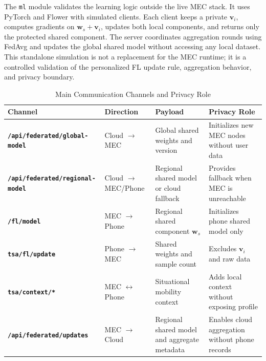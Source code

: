 \documentclass[lettersize,journal]{IEEEtran}
\begin{document}
The \texttt{ml} module validates the learning logic outside the live
MEC stack. It uses PyTorch and Flower with simulated clients. Each
client keeps a private $\mathbf{v}_i$, computes gradients on
$\mathbf{w}_s+\mathbf{v}_i$, updates both local components, and returns
only the protected shared component. The server coordinates aggregation
rounds using FedAvg and updates the global shared model without
accessing any local dataset. This standalone simulation is not a
replacement for the MEC runtime; it is a controlled validation of the
personalized FL update rule, aggregation behavior, and privacy boundary.

\begin{table}[!t]
    \centering
    \caption{Main Communication Channels and Privacy Role\label{tab:protocol}}
    \scriptsize
    \renewcommand{\arraystretch}{1.2}
    \begin{tabularx}{\textwidth}{
        >{\raggedright\bfseries\arraybackslash}p{3.6cm}
        >{\raggedright\arraybackslash}p{3.0cm}
        >{\raggedright}X
        >{\raggedright\arraybackslash}X}
        \toprule
        \rowcolor{gray!15}
        \textbf{Channel} & \textbf{Direction} &
        \textbf{Payload} & \textbf{Privacy Role} \\
        \midrule
        \texttt{/api/federated/global-model} &
        Cloud $\rightarrow$ MEC &
        Global shared weights and version &
        Initializes new MEC nodes without user data \\
        \midrule
        \texttt{/api/federated/regional-model} &
        Cloud $\rightarrow$ MEC/Phone &
        Regional shared model or cloud fallback &
        Provides fallback when MEC is unreachable \\
        \midrule
        \texttt{/fl/model} &
        MEC $\rightarrow$ Phone &
        Regional shared component $\mathbf{w}_s$ &
        Initializes phone shared model only \\
        \midrule
        \texttt{tsa/fl/update} &
        Phone $\rightarrow$ MEC &
        Shared weights and sample count &
        Excludes $\mathbf{v}_i$ and raw data \\
        \midrule
        \texttt{tsa/context/*} &
        MEC $\leftrightarrow$ Phone &
        Situational mobility context &
        Adds local context without exposing profile \\
        \midrule
        \texttt{/api/federated/updates} &
        MEC $\rightarrow$ Cloud &
        Regional shared model and aggregate metadata &
        Enables cloud aggregation without phone records \\
        \bottomrule
    \end{tabularx}
\end{table}
\end{document}
